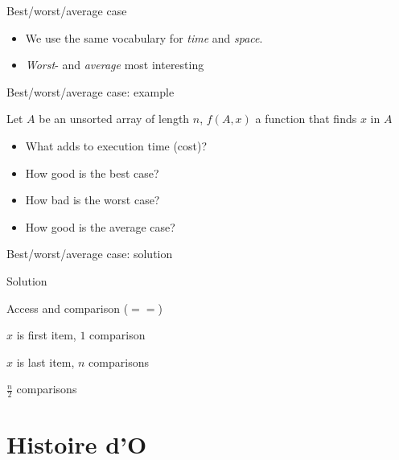 \documentclass[pdf]{beamer}
\begin{document}
\begin{frame}{Best/worst/average case}
    \begin{itemize}
        \item We use the same vocabulary for \emph{time} and \emph{space}.
        \item \emph{Worst}- and \emph{average} most interesting
    \end{itemize}
\end{frame}


\begin{frame}{Best/worst/average case: example}

    \begin{problem}
        Let $A$ be an unsorted array of length $n$, $f(A, x)$ a function that
        finds $x$ in $A$
    \end{problem}

    \begin{itemize}[<+>]
        \item What adds to execution time (cost)?
        \item How good is the best case?
        \item How bad is the worst case?
        \item How good is the average case?
    \end{itemize}
\end{frame}

\begin{frame}{Best/worst/average case: solution}

    \begin{block}{Solution}
        \begin{description}[<+>]
            \item [Cost]    Access and comparison ($ == $)
            \item [Best]    $x$ is first item, $1$ comparison
            \item [Worst]   $x$ is last item, $n$ comparisons
            \item [Average] $\frac{n}{2}$ comparisons
        \end{description}
    \end{block}

\end{frame}

\section{Histoire d'O}
\tableofcontents[currentsection]
\end{document}
